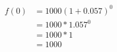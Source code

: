 \documentclass[preview]{standalone}
\begin{document}
\begin{align*}
f(0) &= 1000(1 +0.057)^0\\ &=1000*1.057^0 \\ &=1000*1\\ &=1000
\end{align*}
\end{document}
